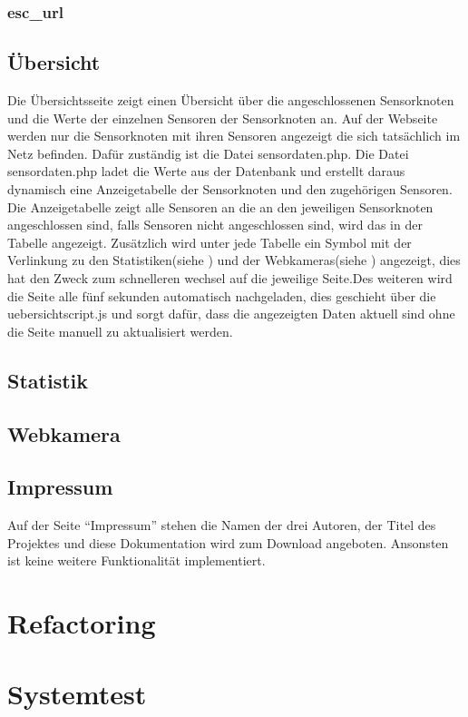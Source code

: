 \subsubsection{esc\_url}

\subsection{Übersicht}
Die Übersichtsseite zeigt einen Übersicht über die angeschlossenen Sensorknoten und die Werte der einzelnen Sensoren der Sensorknoten an. Auf der Webseite werden nur die Sensorknoten mit ihren Sensoren angezeigt die sich tatsächlich im Netz befinden. Dafür zuständig ist die Datei sensordaten.php. Die Datei sensordaten.php ladet die Werte aus der Datenbank und erstellt daraus dynamisch eine Anzeigetabelle der Sensorknoten und den zugehörigen Sensoren. Die Anzeigetabelle zeigt alle Sensoren an die an den jeweiligen Sensorknoten angeschlossen sind, falls Sensoren nicht angeschlossen sind, wird das in der Tabelle angezeigt. Zusätzlich wird unter jede Tabelle ein Symbol mit der Verlinkung zu den Statistiken(siehe ) und der Webkameras(siehe ) angezeigt, dies hat den Zweck zum schnelleren wechsel auf die jeweilige Seite.Des weiteren wird die Seite alle fünf sekunden automatisch nachgeladen, dies geschieht über die uebersichtscript.js und sorgt dafür, dass die angezeigten Daten aktuell sind ohne die Seite manuell zu aktualisiert werden.

\subsection{Statistik}\label{Statistik}
\subsection{Webkamera}\label{Webkamera}
\subsection{Impressum}

Auf der Seite "`Impressum"' stehen die Namen der drei Autoren, der Titel des Projektes und diese Dokumentation wird zum Download angeboten. Ansonsten ist keine weitere Funktionalität implementiert.
\section{Refactoring}
\section{Systemtest}
